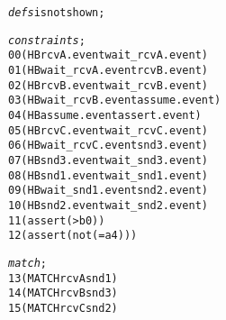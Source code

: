 \newcommand{\reduce}[1]{\ensuremath{\rightarrow_{#1}}}
\newcommand{\reduceK}[1]{\ensuremath{\rightarrow_{#1}^{*}}}
\newcommand{\reduceN}[1]{\ensuremath{\dashrightarrow_{#1}}}
\newcommand{\reduceNK}[1]{\ensuremath{\dashrightarrow_{#1}^{*}}}
\newcommand{\mt}{\ensuremath{\emptyset}}
\newcommand{\trace}{\ensuremath{\mathit{trace}}}
\newcommand{\movebot}{\ensuremath{\mathit{m}}}
\newcommand{\ret}{\ensuremath{\mathbf{ret}}}

\newcommand{\defs}{\ensuremath{\mathrm{defs}}}
\newcommand{\any}{\ensuremath{\mathrm{any}}}
\newcommand{\negate}{\ensuremath{\mathrm{not}}}
\newcommand{\define}{\ensuremath{\mathrm{define}}}
\newcommand{\andd}{\ensuremath{\mathrm{and}}}
\newcommand{\select}{\ensuremath{\mathrm{select}}}
\newcommand{\HB}{\ensuremath{\mathrm{HB}}}
\newcommand{\getlast}{\ensuremath{\mathrm{last}}}
\newcommand{\MATCH}{\ensuremath{\mathrm{MATCH}}}
\newcommand{\ml}{\ensuremath{\mathit{ML}}}
\newcommand{\matchpair}{\ensuremath{\mathrm{MP}}}
\newcommand{\recv}{\ensuremath{\mathrm{\mu}}}
\newcommand{\send}{\ensuremath{\mathrm{\nu}}}



\newsavebox{\boxSMTa}
\begin{lrbox}{\boxSMTa}
\begin{minipage}[c]{0.4\linewidth}
\begin{alltt}
\textit{defs} is not shown;


\textit{constraints};
00 (HB rcvA.event wait_rcvA.event)
01 (HB wait_rcvA.event rcvB.event)
02 (HB rcvB.event wait_rcvB.event)
03 (HB wait_rcvB.event assume.event)
04 (HB assume.event assert.event)
05 (HB rcvC.event wait_rcvC.event)
06 (HB wait_rcvC.event snd3.event)
07 (HB snd3.event wait_snd3.event)
08 (HB snd1.event wait_snd1.event)
09 (HB wait_snd1.event snd2.event)
10 (HB snd2.event wait_snd2.event)
11 (assert (> b 0))
12 (assert (not (= a 4)))

\textit{match};
13 (MATCH rcvA snd1)
14 (MATCH rcvB snd3)
15 (MATCH rcvC snd2)

\end{alltt}
\end{minipage}
\end{lrbox}

